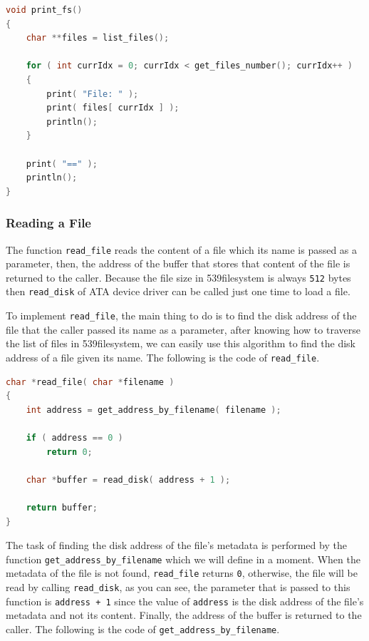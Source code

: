 \begin{lstlisting}[language=C]
void print_fs()
{
    char **files = list_files();

    for ( int currIdx = 0; currIdx < get_files_number(); currIdx++ )
    {
        print( "File: " );
        print( files[ currIdx ] );
        println();
    }
    
    print( "==" );
    println();
}
\end{lstlisting}

\subsubsection{Reading a File}\label{reading-a-file}

The function \lstinline!read_file! reads the content of a file which its
name is passed as a parameter, then, the address of the buffer that
stores that content of the file is returned to the caller. Because the
file size in 539filesystem is always \lstinline!512! bytes then
\lstinline!read_disk! of ATA device driver can be called just one time
to load a file.

To implement \lstinline!read_file!, the main thing to do is to find the
disk address of the file that the caller passed its name as a parameter,
after knowing how to traverse the list of files in 539filesystem, we can
easily use this algorithm to find the disk address of a file given its
name. The following is the code of \lstinline!read_file!.

\begin{lstlisting}[language=C]
char *read_file( char *filename )
{
    int address = get_address_by_filename( filename );
    
    if ( address == 0 )
        return 0;

    char *buffer = read_disk( address + 1 );
    
    return buffer;
}
\end{lstlisting}

The task of finding the disk address of the file's metadata is performed
by the function \lstinline!get_address_by_filename! which we will define
in a moment. When the metadata of the file is not found,
\lstinline!read_file! returns \lstinline!0!, otherwise, the file will be
read by calling \lstinline!read_disk!, as you can see, the parameter
that is passed to this function is \lstinline!address + 1! since the
value of \lstinline!address! is the disk address of the file's metadata
and not its content. Finally, the address of the buffer is returned to
the caller. The following is the code of
\lstinline!get_address_by_filename!.

